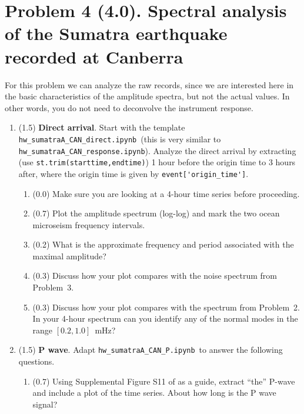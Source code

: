 \documentclass[11pt,titlepage,fleqn]{article}
\newcommand{\tfileresponse}{{\tt hw\_sumatraA\_CAN\_response.ipynb}}
\newcommand{\tfileP}{{\tt hw\_sumatraA\_CAN\_P.ipynb}}
\newcommand{\tfiledirect}{{\tt hw\_sumatraA\_CAN\_direct.ipynb}}
\begin{document}
\section*{Problem 4 (4.0). Spectral analysis of the Sumatra earthquake recorded at Canberra}

For this problem we can analyze the raw records, since we are interested here in the basic characteristics of the amplitude spectra, but not the actual values. In other words, you do not need to deconvolve the instrument response.


\begin{enumerate}
\item (1.5) {\bf Direct arrival}. 
Start with the template \tfiledirect\ (this is very similar to \tfileresponse).
Analyze the direct arrival by extracting (use \verb+st.trim(starttime,endtime)+) 1 hour before the origin time to 3 hours after, where the origin time is given by \verb+event['origin_time']+.

\begin{enumerate}
\item (0.0) Make sure you are looking at a 4-hour time series before proceeding.
\item (0.7) Plot the amplitude spectrum (log-log) and mark the two ocean microseism frequency intervals.
\item (0.2) What is the approximate frequency and period associated with the maximal amplitude?
\item (0.3) Discuss how your plot compares with the noise spectrum from Problem~3.
\item (0.3) Discuss how your plot compares with the spectrum from Problem~2. \\
In your 4-hour spectrum can you identify any of the normal modes in the range $[0.2,1.0]$~mHz?
\end{enumerate}


\item (1.5) {\bf P wave}. Adapt \tfileP\ to answer the following questions.
%
\begin{enumerate}
\item (0.7) Using Supplemental Figure S11 of \citet{Ammon2005} as a guide, extract ``the'' P-wave and include a plot of the time series. About how long is the P wave signal?


\end{enumerate}
\end{enumerate}
\end{document}
